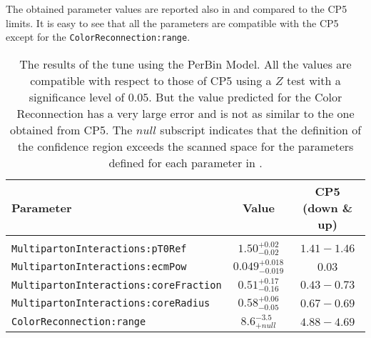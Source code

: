 The obtained parameter values are reported also in  and compared to the CP5 limits. 
It is easy to see that all the parameters are compatible with the CP5 except for the \texttt{ColorReconnection:range}. 
\begin{table}[!htb]
\centering
	\begin{tabular}{l | c | c}
		Parameter & Value & CP5 (down \& up)\\ \hline\hline
		\\[-0.85em]		
\texttt{MultipartonInteractions:pT0Ref} & $ 1.50^{+0.02}_{-0.02}$ & $1.41 - 1.46$\\[3pt]
\texttt{MultipartonInteractions:ecmPow} & $ 0.049_{-0.019}^{+0.018} $ & $0.03$\\[3pt]
\texttt{MultipartonInteractions:coreFraction} & $ 0.51_{-0.16}^{+0.17} $ & $0.43 - 0.73$\\[3pt]
\texttt{MultipartonInteractions:coreRadius} & $ 0.58_{-0.05}^{+0.06} $ & $0.67 - 0.69$\\[3pt]
\texttt{ColorReconnection:range} & $ 8.6 ^{-3.5}_{+null} $ & $4.88 - 4.69$\\[2pt]
\end{tabular}
\caption{The results of the tune using the PerBin Model. All the values are compatible with respect to those of CP5 using a $Z$ test with a significance level of $0.05$. But the value predicted for the Color Reconnection has a very large error and is not as similar to the one obtained from CP5. The $null$ subscript indicates that the definition of the confidence region exceeds the scanned space for the parameters defined for each parameter in .}
\label{table:result_PerBin_5params}
\end{table}

